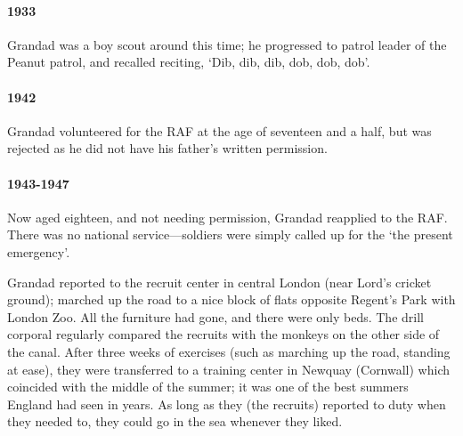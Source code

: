 \paragraph{1933} Grandad was a boy scout around this time; he progressed to patrol leader of the Peanut
patrol, and recalled reciting, `Dib, dib, dib, dob, dob, dob'.

\paragraph{1942} Grandad volunteered for the RAF at the age of seventeen and a half, but
was rejected as he did not have his father's written permission.
\paragraph{1943-1947} Now aged eighteen, and not needing permission, Grandad reapplied to the RAF.
There was no national service---soldiers were simply called up for the `the present
emergency'.
\begin{figure}
	\centering
\end{figure}
Grandad reported to the recruit center in central London (near Lord's cricket ground);
marched up the road to a nice block of flats opposite Regent's Park with London Zoo.
All the furniture had gone, and there were only beds.
The drill corporal regularly compared the recruits with the monkeys on the other side of the canal.
After three weeks of exercises (such as marching up the road, standing at ease), they were transferred to a training
center in Newquay (Cornwall) which coincided with the middle of the summer; it was
one of the best summers England had seen in years. As long as they (the recruits) reported to duty when they needed to,
they could go in the sea whenever they liked.

